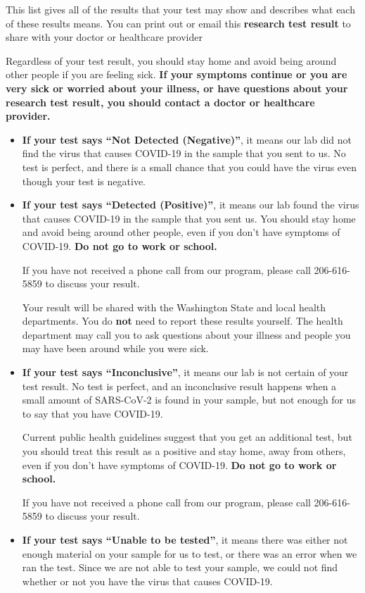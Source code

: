 \documentclass[10pt]{article}
\begin{document}
This list gives all of the results that your test may show and describes what
each of these results means. You can print out or email this \textbf{research
test result} to share with your doctor or healthcare provider

Regardless of your test result, you should stay home and avoid being around
other people if you are feeling sick. \textbf{If your symptoms continue or you are
very sick or worried about your illness, or have questions about your research
test result, you should contact a doctor or healthcare provider.}

\begin{itemize}


\item

  \textbf{If your test says ``Not Detected (Negative)''}, it means our lab did not find the
  virus that causes COVID-19 in the sample that you sent to us. No test is
  perfect, and there is a small chance that you could have the virus even though
  your test is negative.

\item

  \textbf{If your test says ``Detected (Positive)''}, it means our
  lab found the virus that causes COVID-19 in the sample that you sent us. You
  should stay home and avoid being around other people, even if you don’t have
  symptoms of COVID-19. \textbf{Do not go to work or school.}

  If you have not received a phone call from our program, please call
  206-616-5859 to discuss your result.

  Your result will be shared with the Washington State and local health
  departments. You do \textbf{not} need to report these results yourself. The
  health department may call you to ask questions about your illness and people
  you may have been around while you were sick.

\item

  \textbf{If your test says ``Inconclusive''}, it means our lab is not certain
  of your test result. No test is perfect, and an inconclusive result happens
  when a small amount of SARS-CoV-2 is found in your sample, but not enough for
  us to say that you have COVID-19.

  Current public health guidelines suggest that you get an additional test, but
  you should treat this result as a positive and stay home, away from others,
  even if you don’t have symptoms of COVID-19. \textbf{Do not go to work or
  school.}

  If you have not received a phone call from our program, please call
  206-616-5859 to discuss your result.

\item

  \textbf{If your test says ``Unable to be tested''}, it means there was either
  not enough material on your sample for us to test, or there was an error when
  we ran the test. Since we are not able to test your sample, we could not find
  whether or not you have the virus that causes COVID-19.

\end{itemize}
\end{document}
